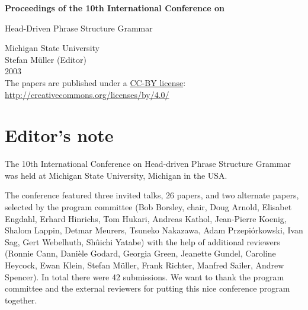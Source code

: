 \documentclass[11pt,a4paper,fleqn]{article}
\begin{document}
\begin{center}
{\Large
                {\bfseries Proceedings of the 10th International Conference on\par Head-Driven Phrase Structure Grammar\par}

                \vspace{8ex}

                     Michigan State University\\[\baselineskip]

                        Stefan M{\"u}ller (Editor)\\[\baselineskip]

                                2003\\[\baselineskip]



The papers are published under a \href{http://creativecommons.org/licenses/by/4.0/}{CC-BY license}:\\[3pt]
\href{http://creativecommons.org/licenses/by/4.0/}{http://creativecommons.org/licenses/by/4.0/}
}
\end{center}
\newpage
\tableofcontents

\newpage

\section*{Editor's note}
The 10th International Conference on Head-driven Phrase Structure Grammar was held at
Michigan State University, Michigan in the USA. 

The conference featured three invited talks, 26 papers, and two alternate papers,
selected by the program committee 
(Bob Borsley, chair,
Doug Arnold,
Elisabet Engdahl,
Erhard Hinrichs,
Tom Hukari,
Andreas Kathol,
Jean-Pierre Koenig,
Shalom Lappin,
Detmar Meurers,
Tsuneko Nakazawa,
Adam Przepiórkowski,
Ivan Sag,
Gert Webelhuth,
Shûichi Yatabe) with the help of additional reviewers (Ronnie Cann,
Danièle Godard, 
Georgia Green,
Jeanette Gundel,
Caroline Heycock,
Ewan Klein,
Stefan Müller,
Frank Richter,
Manfred Sailer, 
Andrew Spencer).
In total there were 42 submissions.
We want to thank the program committee and the external reviewers
for putting this nice conference program together.
\end{document}
